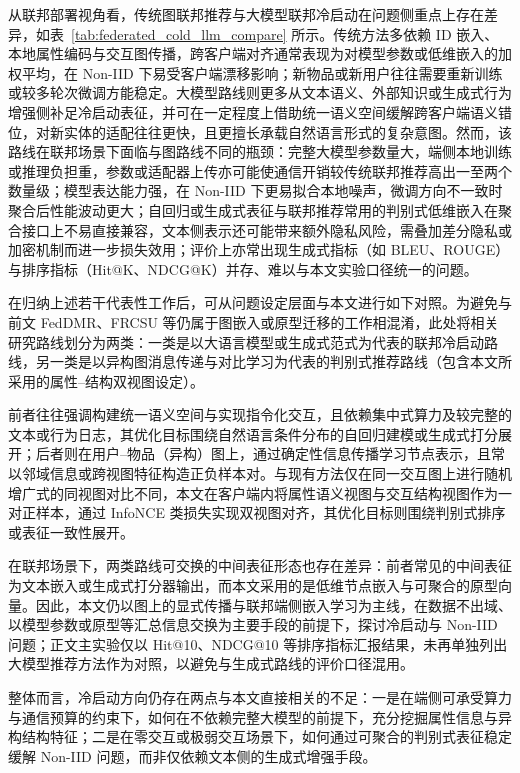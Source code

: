 从联邦部署视角看，传统图联邦推荐与大模型联邦冷启动在问题侧重点上存在差异，如表~\ref{tab:federated_cold_llm_compare} 所示。传统方法多依赖 ID 嵌入、本地属性编码与交互图传播，跨客户端对齐通常表现为对模型参数或低维嵌入的加权平均，在 Non-IID 下易受客户端漂移影响；新物品或新用户往往需要重新训练或较多轮次微调方能稳定。大模型路线则更多从文本语义、外部知识或生成式行为增强侧补足冷启动表征，并可在一定程度上借助统一语义空间缓解跨客户端语义错位，对新实体的适配往往更快，且更擅长承载自然语言形式的复杂意图。然而，该路线在联邦场景下面临与图路线不同的瓶颈：完整大模型参数量大，端侧本地训练或推理负担重，参数或适配器上传亦可能使通信开销较传统联邦推荐高出一至两个数量级；模型表达能力强，在 Non-IID 下更易拟合本地噪声，微调方向不一致时聚合后性能波动更大；自回归或生成式表征与联邦推荐常用的判别式低维嵌入在聚合接口上不易直接兼容，文本侧表示还可能带来额外隐私风险，需叠加差分隐私或加密机制而进一步损失效用；评价上亦常出现生成式指标（如 BLEU、ROUGE）与排序指标（Hit@K、NDCG@K）并存、难以与本文实验口径统一的问题。

在归纳上述若干代表性工作后，可从问题设定层面与本文进行如下对照。为避免与前文 FedDMR\cite{feddmr2025}、FRCSU\cite{li2025frcsu} 等仍属于图嵌入或原型迁移的工作相混淆，此处将相关研究路线划分为两类：一类是以大语言模型或生成式范式为代表的联邦冷启动路线，另一类是以异构图消息传递与对比学习为代表的判别式推荐路线（包含本文所采用的属性–结构双视图设定）。

前者往往强调构建统一语义空间与实现指令化交互，且依赖集中式算力及较完整的文本或行为日志，其优化目标围绕自然语言条件分布的自回归建模或生成式打分展开；后者则在用户–物品（异构）图上，通过确定性信息传播学习节点表示，且常以邻域信息或跨视图特征构造正负样本对。与现有方法仅在同一交互图上进行随机增广式的同视图对比不同，本文在客户端内将属性语义视图与交互结构视图作为一对正样本，通过 InfoNCE 类损失实现双视图对齐，其优化目标则围绕判别式排序或表征一致性展开。

在联邦场景下，两类路线可交换的中间表征形态也存在差异：前者常见的中间表征为文本嵌入或生成式打分器输出，而本文采用的是低维节点嵌入与可聚合的原型向量。因此，本文仍以图上的显式传播与联邦端侧嵌入学习为主线，在数据不出域、以模型参数或原型等汇总信息交换为主要手段的前提下，探讨冷启动与 Non-IID 问题；正文主实验仅以 Hit@10、NDCG@10 等排序指标汇报结果，未再单独列出大模型推荐方法作为对照，以避免与生成式路线的评价口径混用。

整体而言，冷启动方向仍存在两点与本文直接相关的不足：一是在端侧可承受算力与通信预算的约束下，如何在不依赖完整大模型的前提下，充分挖掘属性信息与异构结构特征；二是在零交互或极弱交互场景下，如何通过可聚合的判别式表征稳定缓解 Non-IID 问题，而非仅依赖文本侧的生成式增强手段。

